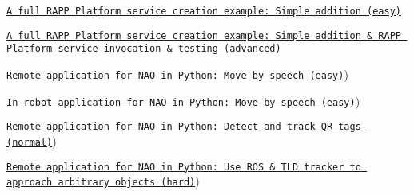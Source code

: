 \begin{DoxyItemize}
\item \href{https://github.com/rapp-project/rapp-platform/wiki/A-full-RAPP-Platform-service-creation-example}{\tt A full R\-A\-P\-P Platform service creation example\-: Simple addition (easy)}
\item \href{https://github.com/rapp-project/rapp-platform/wiki/A-full-RAPP-Platform-service-creation-example-advanced}{\tt A full R\-A\-P\-P Platform service creation example\-: Simple addition \& R\-A\-P\-P Platform service invocation \& testing (advanced)}
\item \href{https://github.com/rapp-project/rapp-platform/wiki/Create-a-remote-robotic-application-for-NAO-in-Python-(novice}{\tt Remote application for N\-A\-O in Python\-: Move by speech (easy)})
\item \href{https://github.com/rapp-project/rapp-platform/wiki/Create-an-in-robot-application-for-NAO-in-Python-(novice}{\tt In-\/robot application for N\-A\-O in Python\-: Move by speech (easy)})
\item \href{https://github.com/rapp-project/rapp-platform/wiki/Remote-application-for-NAO-in-Python:-Detect-and-track-QR-tags-(normal}{\tt Remote application for N\-A\-O in Python\-: Detect and track Q\-R tags (normal)})
\item \href{https://github.com/rapp-project/rapp-platform/wiki/Remote-application-for-NAO-in-Python:-Use-ROS-&-TLD-tracker-to-approach-arbitrary-objects-(hard}{\tt Remote application for N\-A\-O in Python\-: Use R\-O\-S \& T\-L\-D tracker to approach arbitrary objects (hard)}) 
\end{DoxyItemize}